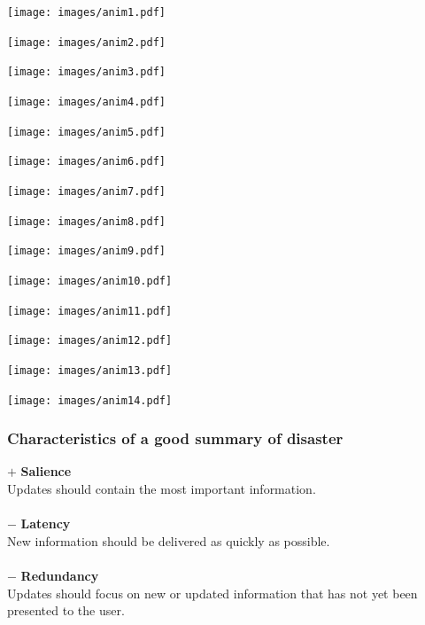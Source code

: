 \documentclass{beamer}
\begin{document}
\begin{frame}
    \texttt{[image: images/anim1.pdf]}
\end{frame}
\begin{frame}
    \texttt{[image: images/anim2.pdf]}
\end{frame}
\begin{frame}
    \texttt{[image: images/anim3.pdf]}
\end{frame}
\begin{frame}
    \texttt{[image: images/anim4.pdf]}
\end{frame}
\begin{frame}
    \texttt{[image: images/anim5.pdf]}
\end{frame}
\begin{frame}
    \texttt{[image: images/anim6.pdf]}
\end{frame}
\begin{frame}
    \texttt{[image: images/anim7.pdf]}
\end{frame}
\begin{frame}
    \texttt{[image: images/anim8.pdf]}
\end{frame}
\begin{frame}
    \texttt{[image: images/anim9.pdf]}
\end{frame}
\begin{frame}
    \texttt{[image: images/anim10.pdf]}
\end{frame}
\begin{frame}
    \texttt{[image: images/anim11.pdf]}
\end{frame}
\begin{frame}
    \texttt{[image: images/anim12.pdf]}
\end{frame}
\begin{frame}
    \texttt{[image: images/anim13.pdf]}
\end{frame}
\begin{frame}
    \texttt{[image: images/anim14.pdf]}
\end{frame}


\begin{frame}
\frametitle{Characteristics of a good summary of disaster}

$\pmb{+}$ \textbf{Salience} \\
Updates should contain the most important information.\\
~\\

$\pmb{-}$ \textbf{Latency} \\
New information should be delivered as quickly as possible.\\
~\\

$\pmb{-}$ \textbf{Redundancy} \\
Updates should focus on new or updated information
that has not yet been presented to the user.\\
~\\

\end{frame}
\end{document}
